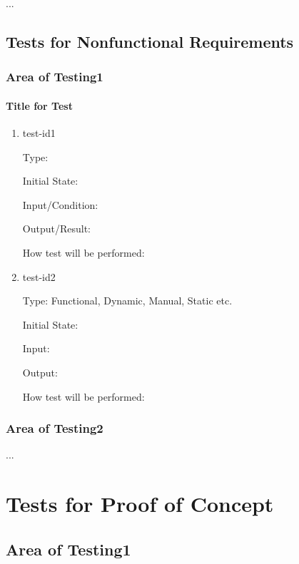\documentclass[12pt, titlepage]{article}
\begin{document}
...

\subsection{Tests for Nonfunctional Requirements}

\subsubsection{Area of Testing1}
		
\paragraph{Title for Test}

\begin{enumerate}

\item{test-id1\\}

Type: 
					
Initial State: 
					
Input/Condition: 
					
Output/Result: 
					
How test will be performed: 
					
\item{test-id2\\}

Type: Functional, Dynamic, Manual, Static etc.
					
Initial State: 
					
Input: 
					
Output: 
					
How test will be performed: 

\end{enumerate}

\subsubsection{Area of Testing2}

...

\section{Tests for Proof of Concept}

\subsection{Area of Testing1}
		
\end{document}
